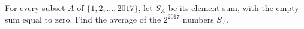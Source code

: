 For every subset $A$ of $\{1,2,\ldots,2017\}$, let $S_A$ be its element sum, with the empty sum equal to zero. Find the average of the $2^{2017}$ numbers $S_A$.
